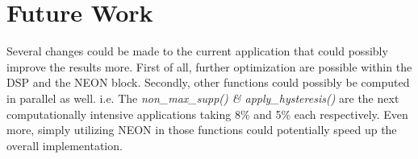 \section{Future Work}
Several changes could be made to the current application that could possibly improve the results more.
First of all, further optimization are possible within the DSP and the NEON block. Secondly, other functions could possibly be computed in parallel as well.
i.e. The \textit{non\_max\_supp() \& apply\_hysteresis()} are the next computationally intensive applications taking 8\% and 5\% each respectively.
Even more, simply utilizing NEON in those functions could potentially speed up the overall implementation.